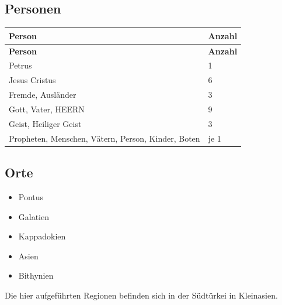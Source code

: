     \subsection{Personen}
    \begin{longtable}{l l}
    \hline
    \textbf{Person} &	\textbf{Anzahl}\\
    \hline
    \endfirsthead
    \hline
    \textbf{Person} &	\textbf{Anzahl}\\
    \hline
    \endhead
    Petrus 
    & 
    1
    \\
    \hline
    Jesus Cristus 
    & 
    6
    \\
    \hline
    Fremde, Ausländer
    & 
    3
    \\
    \hline
    Gott, Vater, HEERN
    & 
    9
    \\
    \hline
    Geist, Heiliger Geist
    & 
    3
    \\
    \hline
    Propheten, Menschen, Vätern, Person, Kinder, Boten
    & 
    je 1
    \\
    \hline
    \end{longtable}

    \subsection{Orte}
    \begin{itemize}
        \item Pontus
        \item Galatien
        \item Kappadokien
        \item Asien
        \item Bithynien
    \end{itemize}
    Die hier aufgeführten Regionen befinden sich in der Südtürkei in Kleinasien.

